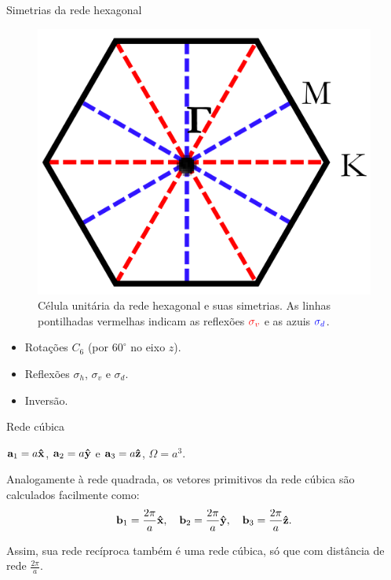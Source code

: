 \documentclass[aspectratio=169]{beamer}
\begin{document}


\begin{frame}{Simetrias da rede hexagonal}

\begin{figure}[H]
\centering
\includegraphics[width=0.3\linewidth]{fig/symm_hexago.png}
\caption{Célula unitária da rede hexagonal e suas simetrias. As linhas pontilhadas vermelhas indicam as reflexões $\textcolor{red}{\sigma_v}$ e as azuis $\textcolor{blue}{\sigma_d}$.}
\label{fig:symm_hexago}
\end{figure}

\begin{itemize}
\item Rotações $C_6$ (por $60^\circ$ no eixo $z$).
\n
\item Reflexões $\sigma_h$, $\sigma_v$ e $\sigma_d$.
\n
\item Inversão.
\end{itemize}

\end{frame}




\begin{frame}{Rede cúbica}

$\vb{a}_1 = a \vu{x}$, $\vb{a}_2 = a\vu{y}$ e $\vb{a}_3 = a\vu{z}$, $\Omega = a^3$.

\n

Analogamente à rede quadrada, os vetores primitivos da rede cúbica são calculados facilmente como:
$$
\vb{b}_1 = \frac{2\pi}{a} \vu{x}, \quad \vb{b}_2 = \frac{2\pi}{a} \vu{y}, \quad \vb{b}_3 = \frac{2\pi}{a} \vu{z}.
$$

Assim, sua rede recíproca também é uma rede cúbica, só que com distância de rede $\frac{2\pi}{a}$.

\end{frame}


\end{document}
